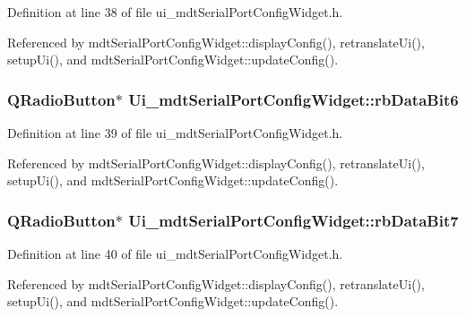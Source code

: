 Definition at line 38 of file ui\-\_\-mdt\-Serial\-Port\-Config\-Widget.\-h.



Referenced by mdt\-Serial\-Port\-Config\-Widget\-::display\-Config(), retranslate\-Ui(), setup\-Ui(), and mdt\-Serial\-Port\-Config\-Widget\-::update\-Config().

\hypertarget{class_ui__mdt_serial_port_config_widget_ac602051e661321ed5426f5cb7b26676c}{
\subsubsection[{rb\-Data\-Bit6}]{\setlength{\rightskip}{0pt plus 5cm}Q\-Radio\-Button$\ast$ Ui\-\_\-mdt\-Serial\-Port\-Config\-Widget\-::rb\-Data\-Bit6}}\label{class_ui__mdt_serial_port_config_widget_ac602051e661321ed5426f5cb7b26676c}


Definition at line 39 of file ui\-\_\-mdt\-Serial\-Port\-Config\-Widget.\-h.



Referenced by mdt\-Serial\-Port\-Config\-Widget\-::display\-Config(), retranslate\-Ui(), setup\-Ui(), and mdt\-Serial\-Port\-Config\-Widget\-::update\-Config().

\hypertarget{class_ui__mdt_serial_port_config_widget_a8fc4228fea093c475ca2f94c562d50c5}{
\subsubsection[{rb\-Data\-Bit7}]{\setlength{\rightskip}{0pt plus 5cm}Q\-Radio\-Button$\ast$ Ui\-\_\-mdt\-Serial\-Port\-Config\-Widget\-::rb\-Data\-Bit7}}\label{class_ui__mdt_serial_port_config_widget_a8fc4228fea093c475ca2f94c562d50c5}


Definition at line 40 of file ui\-\_\-mdt\-Serial\-Port\-Config\-Widget.\-h.



Referenced by mdt\-Serial\-Port\-Config\-Widget\-::display\-Config(), retranslate\-Ui(), setup\-Ui(), and mdt\-Serial\-Port\-Config\-Widget\-::update\-Config().

